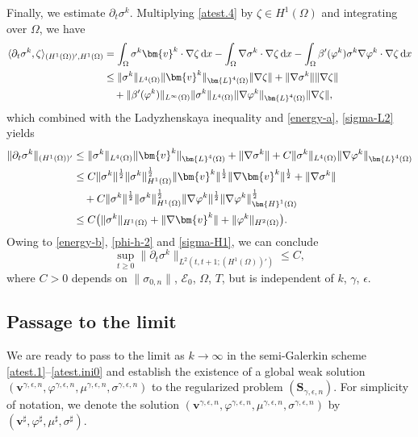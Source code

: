 \documentclass[11pt,reqno]{amsart}
\def\d{{\rm d}}
\def\l{\langle}
\def\r{\rangle}
\def\vv{\bm{v}}
\begin{document}
Finally, we estimate $\partial_t\sigma^k$. Multiplying \eqref{atest.4} by $\zeta\in H^1(\Omega)$ and integrating over $\Omega$, we have
%
\begin{equation*}
\begin{split}
\l \partial_t \sigma^k, \zeta \r_{(H^1(\Omega))',H^1(\Omega)}
&=
\int_{\Omega} \sigma^k \vv^k \cdot \nabla \zeta \, \d x - \int_{\Omega} \nabla \sigma^k \cdot \nabla \zeta \, \d x
-\int_{\Omega} \beta'(\varphi^k)\sigma^k \nabla \varphi^k \cdot \nabla \zeta \, \d x
\\
& \leq
\| \sigma^k\|_{L^4(\Omega)} \| \vv^k\|_{\bm{L}^4(\Omega)}  \| \nabla \zeta\|
+ \| \nabla \sigma^k\| \| \nabla \zeta\|\notag\\
&\quad  + \|\beta'(\varphi^k)\|_{L^\infty(\Omega)} \| \sigma^k\|_{L^4(\Omega)}  \|\nabla \varphi^k\|_{\bm{L}^4(\Omega)}
\| \nabla \zeta\|,
\end{split}
\end{equation*}
%
which combined with the Ladyzhenskaya inequality and
\eqref{energy-a}, \eqref{sigma-L2} yields
%
\begin{align}
\| \partial_t \sigma^k\|_{(H^1(\Omega))'}
& \leq \| \sigma^k\|_{L^4(\Omega)} \| \vv^k\|_{\bm{L}^4(\Omega)}
+ \| \nabla \sigma^k\|  + C\| \sigma^k\|_{L^4(\Omega)}  \|\nabla \varphi^k\|_{\bm{L}^4(\Omega)}
\notag \\
&\leq C \| \sigma^k\|^\frac12 \| \sigma^k\|_{H^1(\Omega)}^\frac12
\| \vv^k\|^\frac12 \| \nabla \vv^k\|^\frac12
 + \| \nabla \sigma^k\|
 \notag \\
&\quad +C \| \sigma^k\|^\frac12 \| \sigma^k\|_{H^1(\Omega)}^\frac12  \|\nabla \varphi^k\|^\frac12 \| \nabla\varphi^k\|_{\bm{H}^1(\Omega)}^\frac12
\notag \\
&\leq C  \big(\| \sigma^k\|_{H^1(\Omega)} + \| \nabla \vv^k\| +  \| \varphi^k\|_{H^2(\Omega)}\big).
\notag
\end{align}
%
Owing to \eqref{energy-b}, \eqref{phi-h-2} and \eqref{sigma-H1}, we can  conclude
%
\begin{equation}
\label{sigma_t}
\sup_{t\geq 0}\| \partial_t \sigma^k\|_{L^2(t,t+1; (H^1(\Omega))')}
\leq C,
\end{equation}
%
where $C>0$ depends on $\|\sigma_{0,n}\|$, $\mathcal{E}_0$, $\Omega$, $T$, but is independent of $k$, $\gamma$, $\epsilon$.


\subsection{Passage to the limit}
\label{limit-k}
%
We are ready to pass to the limit as $k \to \infty$ in the semi-Galerkin scheme \eqref{atest.1}--\eqref{atest.ini0} and establish the existence of a global weak solution $(\bm{v}^{\gamma,\epsilon,n},\varphi^{\gamma,\epsilon,n}, \mu^{\gamma,\epsilon,n}, \sigma^{\gamma,\epsilon,n})$ to the regularized problem $(\bm{S}_{\gamma,\epsilon,n})$. For simplicity of notation, we denote the solution  $(\bm{v}^{\gamma,\epsilon,n},\varphi^{\gamma,\epsilon,n}, \mu^{\gamma,\epsilon,n}, \sigma^{\gamma,\epsilon,n})$ by
$(\bm{v}^{\sharp},\varphi^{\sharp}, \mu^{\sharp}, \sigma^{\sharp})$.
\end{document}
